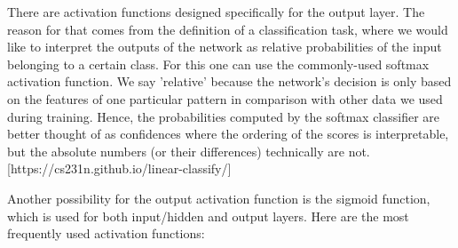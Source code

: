 There are activation functions designed specifically for the output layer. The reason for that comes from the definition of a classification task, where we would like to interpret the outputs of the network as relative probabilities of the input belonging to a certain class. For this one can use the commonly-used softmax activation function. We say 'relative' because the network's decision is only based on the features of one particular pattern in comparison with other data we used during training. Hence, the probabilities computed by the softmax classifier are better thought of as confidences where the ordering of the scores is interpretable, but the absolute numbers (or their differences) technically are not. [https://cs231n.github.io/linear-classify/]

Another possibility for the output activation function is the sigmoid function, which is used for both input/hidden and output layers. Here are the most frequently used activation functions:


